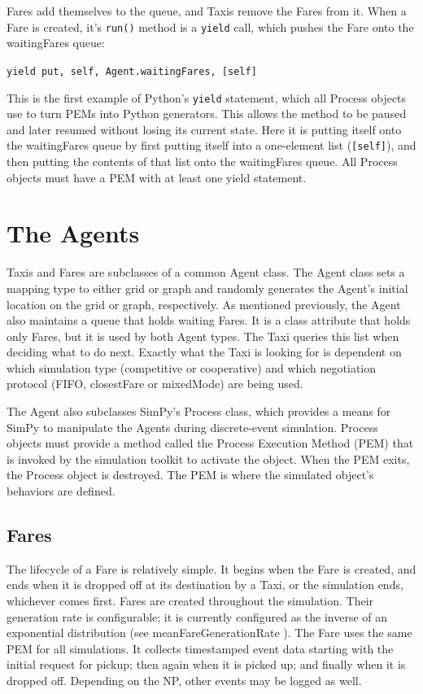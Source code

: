 \documentclass[11pt,letterpaper,onecolumn,twoside,openright,final]{report}
\begin{document}
Fares add themselves to the queue, and Taxis remove the Fares from it.
When a Fare is created, it's \texttt{run()} method is a \texttt{yield} call, which pushes the Fare onto the waitingFares queue:

\texttt{yield put, self, Agent.waitingFares, [self]}

This is the first example of Python's \texttt{yield} statement, which all Process objects use to turn PEMs into Python generators.
This allows the method to be paused and later resumed without losing its current state.
Here it is putting itself onto the waitingFares queue by first putting itself into a one-element list (\texttt{[self]}), and then putting the contents of that list onto the waitingFares queue.
All Process objects must have a PEM with at least one yield statement.

\section{The Agents}
Taxis and Fares are subclasses of a common Agent class.
The Agent class sets a mapping type to either grid or graph and randomly generates the Agent's initial location on the grid or graph, respectively.
As mentioned previously, the Agent also maintains a queue that holds waiting Fares.
It is a class attribute that holds only Fares, but it is used by both Agent types.
The Taxi queries this list when deciding what to do next.
Exactly what the Taxi is looking for is dependent on which simulation type (competitive or cooperative) and which negotiation protocol (FIFO, closestFare or mixedMode) are being used.

The Agent also subclasses SimPy's Process class, which provides a means for SimPy to manipulate the Agents during discrete-event simulation.
Process objects must provide a method called the Process Execution Method (PEM) that is invoked by the simulation toolkit to activate the object.
When the PEM exits, the Process object is destroyed.
The PEM is where the simulated object's behaviors are defined.

\subsection{Fares}
The lifecycle of a Fare is relatively simple.
It begins when the Fare is created, and ends when it is dropped off at its destination by a Taxi, or the simulation ends, whichever comes first.
Fares are created throughout the simulation.
Their generation rate is configurable; it is currently configured as the inverse of an exponential distribution (see meanFareGenerationRate ).
The Fare uses the same PEM for all simulations.
It collects timestamped event data starting with the initial request for pickup; then again when it is picked up; and finally when it is dropped off.
Depending on the NP, other events may be logged as well.
\end{document}
